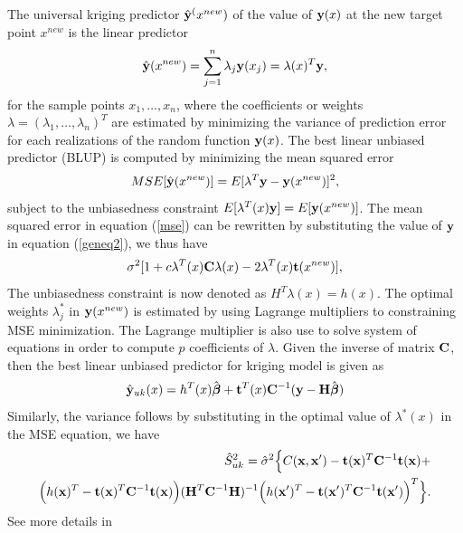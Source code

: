 \documentclass[12pt,titlepage]{report}
\newcommand{\bt}{{\bf t}}
\newcommand{\bH}{{\bf H}}
\newcommand{\bC}{{\bf C}}
\newcommand{\bx}{{\bf x}}
\newcommand{\by}{{\bf y}}
\newcommand{\hby}{{\hat {\bf y}}}
\newcommand{\hbbeta}{{\hat{\boldsymbol{\beta}}}}
\theoremstyle{definition}
\theoremstyle{remark}
\begin{document}
The universal kriging predictor $\hby^(x^{new})$ of the value of $\by(x)$ at the new target point $x^{new}$ is the linear predictor
\begin{equation}
\hby(x^{new})=\sum_{j=1}^n \lambda_j \by (x_j)=\lambda(x)^T\by,
\end{equation}
for the sample points $x_1, \ldots , x_n$, where the coefficients or weights $\lambda=(\lambda_1, \ldots, \lambda_n)^T$ are estimated by minimizing the variance of prediction error for each realizations of the random function $\by(x)$. The best linear unbiased predictor (BLUP) is computed by minimizing the mean squared error
\begin{equation}\label{mse}
MSE[\hby(x^{new})]=E[\lambda^T\by-\by(x^{new})]^2,
\end{equation}
subject to the unbiasedness constraint $E[\lambda^T(x)\by] = E[\by(x^{new})]$. The mean squared error in equation (\ref{mse}) can be rewritten by substituting the value of $\by$ in equation (\ref{geneq2}), we thus have 
\begin{equation}
\sigma^2[1 + c\lambda^T(x)\bC\lambda(x) - 2\lambda^T(x)\bt(x^{new})],
\end{equation}
The unbiasedness constraint is now denoted as $H^T\lambda(x) = h(x)$. 
The optimal weights $\lambda^{*}_j$ in $\by(x^{new})$ is estimated by using Lagrange multipliers to constraining MSE minimization. The Lagrange multiplier is also use to solve system of equations in order to compute $p$ coefficients of $\lambda$.
Given the inverse of matrix $\bC$, then the best linear unbiased predictor for kriging model is given as
\begin{equation}\label{man}
\hby_{uk}(x) = h^T(x)\hbbeta+ \bt^T(x)\bC^{-1}(\by -\bH\hbbeta)
\end{equation}
Similarly, the variance follows by substituting in the optimal value of $\lambda^*(x)$ in the MSE equation, we have
\begin{multline}\label{olu2b}%
\begin{split}
\hat S^2_{uk}=\hat \sigma^2 \Big \{C(\bx,\bx') -\bt(\bx)^T\bC^{-1} \bt(\bx) + \\ \Big ( h(\bx)^T-\bt(\bx)^T\bC^{-1}\bt(\bx) \Big )
(\bH^T\bC^{-1}\bH)^{-1}\Big (h(\bx')^T-\bt(\bx')^T\bC^{-1}\bt(\bx') \Big )^T
\Big \}.
\end{split}
\end{multline}
See more details in \citep{pd4,pd5,pd20}
\end{document}
